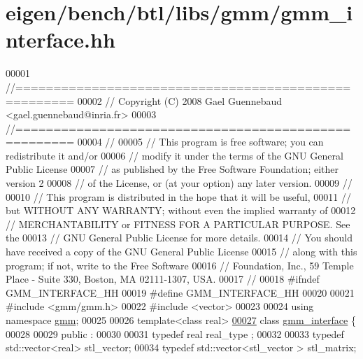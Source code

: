 \hypertarget{eigen_2bench_2btl_2libs_2gmm_2gmm__interface_8hh_source}{}\section{eigen/bench/btl/libs/gmm/gmm\+\_\+interface.hh}
\label{eigen_2bench_2btl_2libs_2gmm_2gmm__interface_8hh_source}

\begin{DoxyCode}
00001 \textcolor{comment}{//=====================================================}
00002 \textcolor{comment}{// Copyright (C) 2008 Gael Guennebaud <gael.guennebaud@inria.fr>}
00003 \textcolor{comment}{//=====================================================}
00004 \textcolor{comment}{//}
00005 \textcolor{comment}{// This program is free software; you can redistribute it and/or}
00006 \textcolor{comment}{// modify it under the terms of the GNU General Public License}
00007 \textcolor{comment}{// as published by the Free Software Foundation; either version 2}
00008 \textcolor{comment}{// of the License, or (at your option) any later version.}
00009 \textcolor{comment}{//}
00010 \textcolor{comment}{// This program is distributed in the hope that it will be useful,}
00011 \textcolor{comment}{// but WITHOUT ANY WARRANTY; without even the implied warranty of}
00012 \textcolor{comment}{// MERCHANTABILITY or FITNESS FOR A PARTICULAR PURPOSE.  See the}
00013 \textcolor{comment}{// GNU General Public License for more details.}
00014 \textcolor{comment}{// You should have received a copy of the GNU General Public License}
00015 \textcolor{comment}{// along with this program; if not, write to the Free Software}
00016 \textcolor{comment}{// Foundation, Inc., 59 Temple Place - Suite 330, Boston, MA  02111-1307, USA.}
00017 \textcolor{comment}{//}
00018 \textcolor{preprocessor}{#ifndef GMM\_INTERFACE\_HH}
00019 \textcolor{preprocessor}{#define GMM\_INTERFACE\_HH}
00020 
00021 \textcolor{preprocessor}{#include <gmm/gmm.h>}
00022 \textcolor{preprocessor}{#include <vector>}
00023 
00024 \textcolor{keyword}{using namespace }\hyperlink{namespacegmm}{gmm};
00025 
00026 \textcolor{keyword}{template}<\textcolor{keyword}{class} real>
\hyperlink{classgmm__interface}{00027} \textcolor{keyword}{class }\hyperlink{classgmm__interface}{gmm\_interface} \{
00028 
00029 public :
00030 
00031   \textcolor{keyword}{typedef} real real\_type ;
00032 
00033   \textcolor{keyword}{typedef} std::vector<real>  stl\_vector;
00034   \textcolor{keyword}{typedef} std::vector<stl\_vector > stl\_matrix;

\end{DoxyCode}

